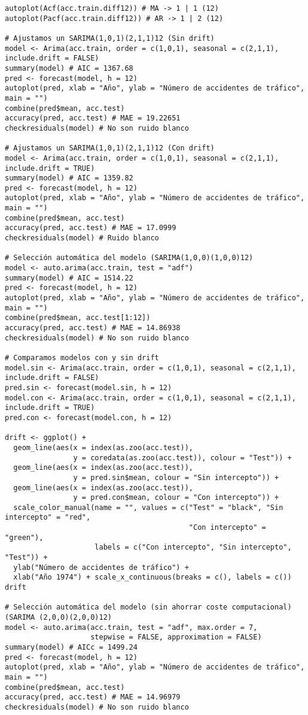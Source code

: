 \documentclass[12pt,a4paper,oneside]{article}
\begin{document}
\begin{Verbatim}[fontsize=\footnotesize]
autoplot(Acf(acc.train.diff12)) # MA -> 1 | 1 (12)
autoplot(Pacf(acc.train.diff12)) # AR -> 1 | 2 (12)

# Ajustamos un SARIMA(1,0,1)(2,1,1)12 (Sin drift)
model <- Arima(acc.train, order = c(1,0,1), seasonal = c(2,1,1), include.drift = FALSE)
summary(model) # AIC = 1367.68
pred <- forecast(model, h = 12)
autoplot(pred, xlab = "Año", ylab = "Número de accidentes de tráfico", main = "")
combine(pred$mean, acc.test)
accuracy(pred, acc.test) # MAE = 19.22651
checkresiduals(model) # No son ruido blanco

# Ajustamos un SARIMA(1,0,1)(2,1,1)12 (Con drift)
model <- Arima(acc.train, order = c(1,0,1), seasonal = c(2,1,1), include.drift = TRUE)
summary(model) # AIC = 1359.82
pred <- forecast(model, h = 12)
autoplot(pred, xlab = "Año", ylab = "Número de accidentes de tráfico", main = "")
combine(pred$mean, acc.test)
accuracy(pred, acc.test) # MAE = 17.0999
checkresiduals(model) # Ruido blanco

# Selección automática del modelo (SARIMA(1,0,0)(1,0,0)12)
model <- auto.arima(acc.train, test = "adf")
summary(model) # AIC = 1514.22
pred <- forecast(model, h = 12)
autoplot(pred, xlab = "Año", ylab = "Número de accidentes de tráfico", main = "")
combine(pred$mean, acc.test[1:12])
accuracy(pred, acc.test) # MAE = 14.86938
checkresiduals(model) # No son ruido blanco

# Comparamos modelos con y sin drift
model.sin <- Arima(acc.train, order = c(1,0,1), seasonal = c(2,1,1), include.drift = FALSE)
pred.sin <- forecast(model.sin, h = 12)
model.con <- Arima(acc.train, order = c(1,0,1), seasonal = c(2,1,1), include.drift = TRUE)
pred.con <- forecast(model.con, h = 12)

drift <- ggplot() +
  geom_line(aes(x = index(as.zoo(acc.test)),
                y = coredata(as.zoo(acc.test)), colour = "Test")) +
  geom_line(aes(x = index(as.zoo(acc.test)),
                y = pred.sin$mean, colour = "Sin intercepto")) +
  geom_line(aes(x = index(as.zoo(acc.test)),
                y = pred.con$mean, colour = "Con intercepto")) +
  scale_color_manual(name = "", values = c("Test" = "black", "Sin intercepto" = "red",
                                           "Con intercepto" = "green"),
                     labels = c("Con intercepto", "Sin intercepto", "Test")) +
  ylab("Número de accidentes de tráfico") +
  xlab("Año 1974") + scale_x_continuous(breaks = c(), labels = c())
drift

# Selección automática del modelo (sin ahorrar coste computacional) (SARIMA (2,0,0)(2,0,0)12)
model <- auto.arima(acc.train, test = "adf", max.order = 7,
                    stepwise = FALSE, approximation = FALSE)
summary(model) # AICc = 1499.24
pred <- forecast(model, h = 12)
autoplot(pred, xlab = "Año", ylab = "Número de accidentes de tráfico", main = "")
combine(pred$mean, acc.test)
accuracy(pred, acc.test) # MAE = 14.96979
checkresiduals(model) # No son ruido blanco


\end{Verbatim}
\end{document}
